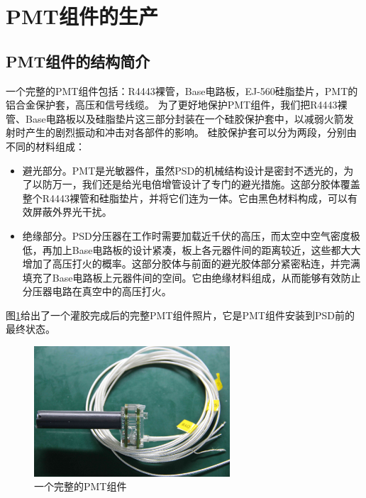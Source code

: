 \section{PMT组件的生产}
\label{sec:construction:pmt_production}

\subsection{PMT组件的结构简介}
\label{sec:construction:pmt_assembly}
一个完整的PMT组件包括：R4443裸管，Base电路板，EJ-560硅脂垫片，PMT的铝合金保护套，高压和信号线缆。
为了更好地保护PMT组件，我们把R4443裸管、Base电路板以及硅脂垫片这三部分封装在一个硅胶保护套中，以减弱火箭发射时产生的剧烈振动和冲击对各部件的影响。
硅胶保护套可以分为两段，分别由不同的材料组成：
\begin{itemize}
	\item 避光部分。PMT是光敏器件，虽然PSD的机械结构设计是密封不透光的，为了以防万一，我们还是给光电倍增管设计了专门的避光措施。这部分胶体覆盖整个R4443裸管和硅脂垫片，并将它们连为一体。它由黑色材料构成，可以有效屏蔽外界光干扰。
	\item 绝缘部分。PSD分压器在工作时需要加载近千伏的高压，而太空中空气密度极低，再加上Base电路板的设计紧凑，板上各元器件间的距离较近，这些都大大增加了高压打火的概率。这部分胶体与前面的避光胶体部分紧密粘连，并完满填充了Base电路板上元器件间的空间。它由绝缘材料组成，从而能够有效防止分压器电路在真空中的高压打火。
\end{itemize}
图\ref{fig:construction:pmt_assembly}给出了一个灌胶完成后的完整PMT组件照片，它是PMT组件安装到PSD前的最终状态。
\begin{figure}[htbp]
	\centering
	\includegraphics[width=0.65\textwidth]{chap/construction/fig/pmt_assembly.jpg}
	\caption{一个完整的PMT组件}
	\label{fig:construction:pmt_assembly}
\end{figure}

